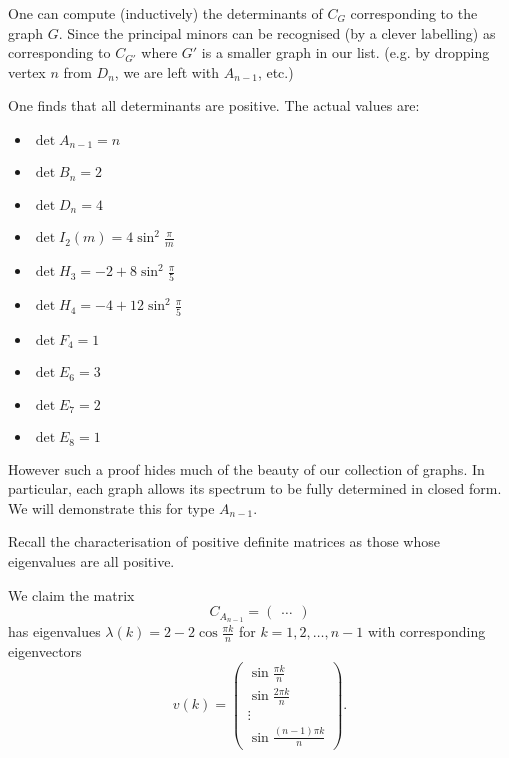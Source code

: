
One can compute (inductively) the determinants of $C_G$ corresponding to
the graph $G$. Since the principal minors can be recognised (by a clever labelling)
as corresponding to $C_{G'}$ where $G'$ is a smaller graph in our list.
(e.g. by dropping vertex $n$ from $D_n$, we are left with $A_{n-1}$, etc.)

One finds that all determinants are positive. The actual values are:
\begin{itemize}
\item $\det A_{n-1} = n$
\item $\det B_{n} = 2$
\item $\det D_n = 4$
\item $\det I_2(m) = 4 \sin^2 \frac{\pi}{m}$
\item $\det H_3 = -2 + 8 \sin^2 \frac{\pi}{5}$
\item $\det H_4 = -4 + 12 \sin^2 \frac{\pi}{5}$
\item $\det F_4 = 1$
\item $\det E_6 = 3$
\item $\det E_7 = 2$
\item $\det E_8 = 1$
\end{itemize}

However such a proof hides much of the beauty of our collection of graphs. In
particular, each graph allows its spectrum to be fully determined in closed
form. We will demonstrate this for type $A_{n-1}$.

Recall the characterisation of positive definite matrices as those whose
eigenvalues are all positive.

We claim the matrix
\[
    C_{A_{n-1}} = \begin{pmatrix}
    \dots
    \end{pmatrix}
\]
has eigenvalues $\lambda(k) = 2 - 2 \cos \frac{\pi k}{n}$ for $k=1,2,\dots,n-1$
with corresponding eigenvectors
\[
    v(k) = \begin{pmatrix}
        \sin \frac{\pi k}{n} \\
        \sin \frac{2 \pi k}{n} \\
        \vdots \\
        \sin \frac{(n-1) \pi k}{n}
    \end{pmatrix}.
\]

